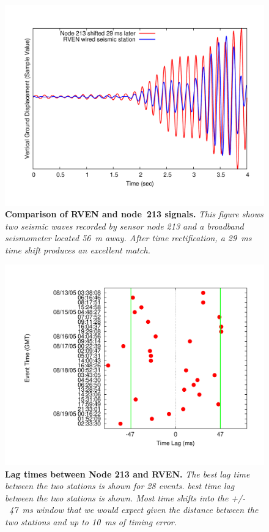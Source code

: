 \begin{figure}[t]
\begin{center}
\includegraphics[width=\hsize]{./evaluation/figs/timing/RV213/2005-08-15_09.11.28/213VREFTEK-NEGATIVE29MS-OFFSET.pdf}
\end{center}
\caption{\small {\bf Comparison of RVEN and node~213 signals.} 
{\em This figure shows two seismic waves recorded by sensor node 213 and a
broadband seismometer located 56~m away. After time rectification, a 29~ms
time shift produces an excellent match.}}
\label{fig-rvenv213}
\end{figure}

\begin{figure}[t]
\begin{center}
\includegraphics[width=\hsize]{./evaluation/figs/timing/RV213/Table/213-GOODDIFFS2.pdf}
\end{center}
\caption{\small{\bf Lag times between Node 213 and RVEN.}
{\em The best lag time between the two stations is shown for 28 events.  best
time lag between the two stations is shown.  Most time shifts into the
+/-~47~ms window that we would expect given the distance between the two
stations and up to 10~ms of timing error.}}
\label{fig-rvenv213all}
\end{figure}

